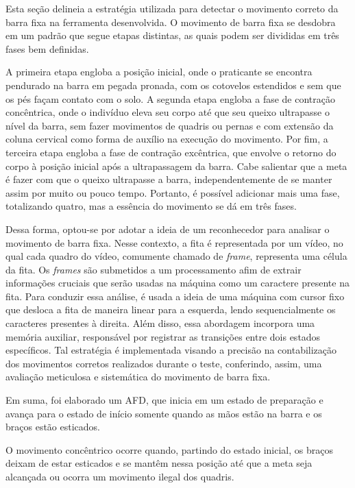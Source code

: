 Esta seção delineia a estratégia utilizada para detectar o movimento correto da barra fixa na ferramenta desenvolvida. O movimento de barra fixa se desdobra em um padrão que segue etapas distintas, as quais podem ser divididas em três fases bem definidas.

A primeira etapa engloba a posição inicial, onde o praticante se encontra pendurado na barra em pegada pronada, com os cotovelos estendidos e sem que os pés façam contato com o solo. A segunda etapa engloba a fase de contração concêntrica, onde o indivíduo eleva seu corpo até que seu queixo ultrapasse o nível da barra, sem fazer movimentos de quadris ou pernas e com extensão da coluna cervical como forma de auxílio na execução do movimento. Por fim, a terceira etapa engloba a fase de contração excêntrica, que envolve o retorno do corpo à posição inicial após a ultrapassagem da barra. Cabe salientar que a meta é fazer com que o queixo ultrapasse a barra, independentemente de se manter assim por muito ou pouco tempo. Portanto, é possível adicionar mais uma fase, totalizando quatro, mas a essência do movimento se dá em três fases.

Dessa forma, optou-se por adotar a ideia de um reconhecedor para analisar o movimento de barra fixa. Nesse contexto, a fita é representada por um vídeo, no qual cada quadro do vídeo, comumente chamado de \textit{frame}, representa uma célula da fita. Os \textit{frames} são submetidos a um processamento afim de extrair informações cruciais que serão usadas na máquina como um caractere presente na fita. Para conduzir essa análise, é usada a ideia de uma máquina com cursor fixo que desloca a fita de maneira linear para a esquerda, lendo sequencialmente os caracteres presentes à direita. Além disso, essa abordagem incorpora uma memória auxiliar, responsável por registrar as transições entre dois estados específicos. Tal estratégia é implementada visando a precisão na contabilização dos movimentos corretos realizados durante o teste, conferindo, assim, uma avaliação meticulosa e sistemática do movimento de barra fixa.

Em suma, foi elaborado um \ac{AFD}, que inicia em um estado de preparação e avança para o estado de início somente quando as mãos estão na barra e os braços estão esticados.

O movimento concêntrico ocorre quando, partindo do estado inicial, os braços deixam de estar esticados e se mantêm nessa posição até que a meta seja alcançada ou ocorra um movimento ilegal dos quadris.

